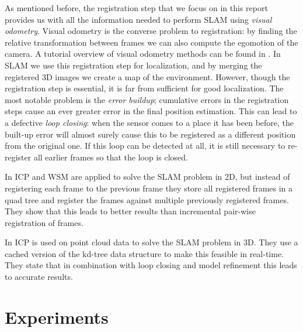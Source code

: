\documentclass[a4paper]{article}
\begin{document}
As mentioned before, the registration step that we focus on in this report provides us with all the information needed to perform \ac{SLAM} using \emph{visual odometry}. Visual odometry is the converse problem to registration: by finding the relative transformation between frames we can also compute the egomotion of the camera. A tutorial overview of visual odometry methods can be found in \cite{scaramuzzavisual,fraundorfervisual}. In \ac{SLAM} we use this registration step for localization, and by merging the registered 3D images we create a map of the environment. However, though the registration step is essential, it is far from sufficient for good localization. The most notable problem is the \emph{error buildup}; cumulative errors in the registration steps cause an ever greater error in the final position estimation. This can lead to a defective \emph{loop closing}: when the sensor comes to a place it has been before, the built-up error will almost surely cause this to be registered as a different position from the original one. If this loop can be detected at all, it is still necessary to re-register all earlier frames so that the loop is closed. 


In \cite{slamet2008boosting} \ac{ICP} and \ac{WSM} are applied to solve the \ac{SLAM} problem in 2D, but instead of registering each frame to the previous frame they store all registered frames in a quad tree and register the frames against multiple previously registered frames. They show that this leads to better results than incremental pair-wise registration of frames.

In \cite{nuchter20076d} \ac{ICP} is used on point cloud data to solve the \ac{SLAM} problem in 3D. They use a cached version of the kd-tree data structure to make this feasible in real-time. They state that in combination with loop closing and model refinement this leads to accurate results.



\section{Experiments}
\end{document}
